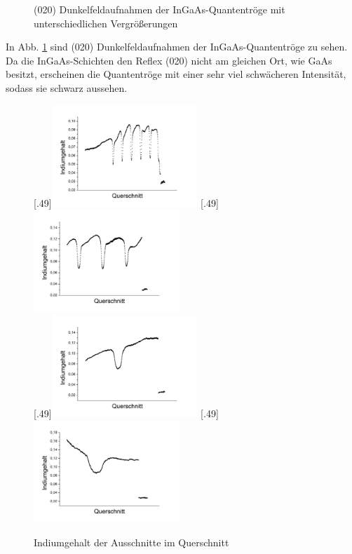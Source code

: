 \documentclass[a4paper,11pt,DIV=11]{scrartcl}
\begin{document}
\begin{figure}[htb]
	\caption{(020) Dunkelfeldaufnahmen der InGaAs-Quantentröge mit unterschiedlichen Vergrößerungen} \label{trogdunkel}
\end{figure}

In Abb. \ref{trogdunkel} sind (020) Dunkelfeldaufnahmen der InGaAs-Quantentröge zu sehen. Da die InGaAs-Schichten den Reflex (020) nicht am gleichen Ort, wie GaAs besitzt, erscheinen die Quantentröge mit einer sehr viel schwächeren Intensität, sodass sie schwarz aussehen.

\begin{figure}[htb]\centering
	[.49\linewidth]{\includegraphics[width=0.49\textwidth]{Versuchsdaten/11/34000xausschnitt.png}}
	[.49\linewidth]{\includegraphics[width=0.49\textwidth]{Versuchsdaten/11/87000xausschnitt.png}}\\
	[.49\linewidth]{\includegraphics[width=0.49\textwidth]{Versuchsdaten/11/185000xausschnitt.png}}
	[.49\linewidth]{\includegraphics[width=0.49\textwidth]{Versuchsdaten/11/380000xausschnitt.png}}
	\caption{Indiumgehalt der Ausschnitte im Querschnitt} \label{indprofil}
\end{figure}
\end{document}
